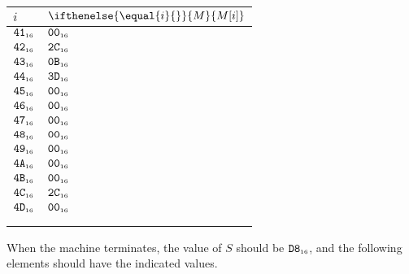 \documentclass[a4paper,12pt]{article}
\makeatletter
\newcommand{\num}[1]{\texttt{#1}}
\newcommand{\hex}[1]{\num{#1}_{\textup{\tiny 16}}}
\newcommand{\MEM}[1]{\ifthenelse{\equal{#1}{}}{M}{M[#1]}}
\newcommand{\SP}{S}
\newenvironment{memtable}{%
  \begin{trivlist}
    \item
    }{%
    \end{trivlist}}
\newenvironment{memcolumn}{%
  \begin{tabular}{@{}ll@{}}
    $i$ & $\MEM{i}$ \\
    \hline}
    {%
  \end{tabular}}
\makeatother
\begin{document}
\begin{memtable}
\begin{memcolumn}
    $\hex{41}$ & $\hex{00}$ \\
    $\hex{42}$ & $\hex{2C}$ \\
    $\hex{43}$ & $\hex{0B}$ \\
    $\hex{44}$ & $\hex{3D}$ \\
    $\hex{45}$ & $\hex{00}$ \\
    $\hex{46}$ & $\hex{00}$ \\
    $\hex{47}$ & $\hex{00}$ \\
    $\hex{48}$ & $\hex{00}$ \\
    $\hex{49}$ & $\hex{00}$ \\
    $\hex{4A}$ & $\hex{00}$ \\
    $\hex{4B}$ & $\hex{00}$ \\
    $\hex{4C}$ & $\hex{2C}$ \\
    $\hex{4D}$ & $\hex{00}$ \\
    \\
    \\
  \end{memcolumn}
\end{memtable}
When the machine terminates, the value of $\SP$ should be $\hex{D8}$, and the following elements should have the indicated values.
\end{document}
